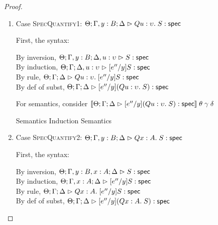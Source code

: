 \begin{proof}
\begin{enumerate}
\item Case \textsc{SpecQuantify1}: $\judgeS[\Theta; \Gamma, y:B; \Delta]{Q u:\upsilon.\;S}$
  
  First, the syntax:
  \begin{tabbedproof}
    \oo By inversion, $\judgeS[\Theta; \Gamma, y:B; \Delta, u:\upsilon]{S}$ \\
    \oo By induction, $\judgeS[\Theta; \Gamma; \Delta, u:\upsilon]{[e''/y]S}$ \\
    \oo By rule, $\judgeS[\Theta; \Gamma; \Delta]
                         {Q u:\upsilon.\;[e''/y]S}$ \\
    \oo By def of subst, $\judgeS[\Theta; \Gamma; \Delta]
                                 {[e''/y](Q u:\upsilon.\;S)}$ 
  \end{tabbedproof}

  For semantics, consider
  $\interp{\judgeS[\Theta; \Gamma; \Delta]
                  {[e''/y](Q u:\upsilon.\;S)}}\;\theta\;\gamma\;\delta$ 
  \begin{eqnproof}
          {Semantics}
          {Induction}
          {Semantics}
  \end{eqnproof}

\item Case \textsc{SpecQuantify2}: $\judgeS[\Theta; \Gamma, y:B; \Delta]{Q x:A.\;S}$
  
  First, the syntax:
  \begin{tabbedproof}
    \oo By inversion, $\judgeS[\Theta; \Gamma, y:B, x:A; \Delta]{S}$ \\
    \oo By induction, $\judgeS[\Theta; \Gamma, x:A; \Delta]{[e''/y]S}$ \\
    \oo By rule, $\judgeS[\Theta; \Gamma; \Delta]
                         {Q x:A.\;[e''/y]S}$ \\
    \oo By def of subst, $\judgeS[\Theta; \Gamma; \Delta]
                                 {[e''/y](Q x:A.\;S)}$ 
  \end{tabbedproof}


\end{enumerate}
\end{proof}
